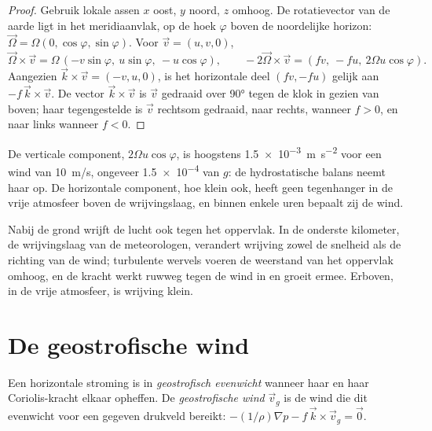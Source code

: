 \begin{proof}
Gebruik lokale assen $x$ oost, $y$ noord, $z$ omhoog. De rotatievector van de aarde ligt in het meridiaanvlak, op de hoek $\varphi$ boven de noordelijke horizon: $\vec\Omega =
\Omega(0, \cos\varphi, \sin\varphi)$. Voor $\vec v = (u, v, 0)$,
\[
  \vec\Omega\times\vec v = \Omega\,(-v\sin\varphi,\ u\sin\varphi,\ -u\cos\varphi),
  \qquad -2\vec\Omega\times\vec v = (f v,\ -f u,\ 2\Omega u\cos\varphi).
\]
Aangezien $\vec k\times\vec v = (-v, u, 0)$, is het horizontale deel $(fv, -fu)$ gelijk aan
$-f\,\vec k\times\vec v$. De vector $\vec k\times\vec v$ is $\vec v$ gedraaid over
\ang{90} tegen de klok in gezien van boven; haar tegengestelde is $\vec v$ rechtsom gedraaid, naar rechts, wanneer $f > 0$, en naar links wanneer $f < 0$.
\end{proof}

De verticale component, $2\Omega u\cos\varphi$, is hoogstens \qty{1.5e-3}{m.s^{-2}} voor een wind van \qty{10}{m/s}, ongeveer \num{1.5e-4} van $g$: de hydrostatische balans neemt haar op. De horizontale component, hoe klein ook, heeft geen tegenhanger in de vrije atmosfeer boven de wrijvingslaag, en binnen enkele uren bepaalt zij de wind.

Nabij de grond wrijft de lucht ook tegen het oppervlak. In de onderste kilometer, de wrijvingslaag van de meteorologen, verandert wrijving zowel de snelheid als de richting van de wind; turbulente wervels voeren de weerstand van het oppervlak omhoog, en de kracht werkt ruwweg tegen de wind in en groeit ermee. Erboven, in de vrije atmosfeer, is wrijving klein.

\section{De geostrofische wind}\label{sec:b1:atmospheric-circulation:geostrophic}

\begin{definition}\label{def:b1:atmospheric-circulation:geostrophic}
Een horizontale stroming is in \emph{geostrofisch evenwicht} wanneer haar  en haar Coriolis-kracht elkaar opheffen. De \emph{geostrofische
wind} $\vec v_g$ is de wind die dit evenwicht voor een gegeven drukveld bereikt: $-(1/\rho)\nabla p - f\,\vec k\times\vec v_g = \vec 0$.
\end{definition}


